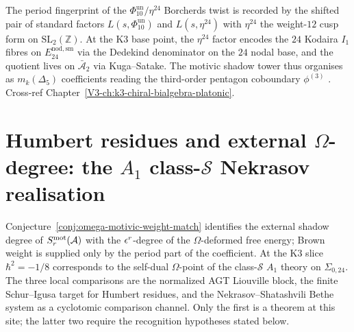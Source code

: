 \begin{remark}
\label{rem:mst-2}
The period fingerprint of the
$\Phi_{10}^{\mathrm{un}}/\eta^{24}$ Borcherds twist is recorded by
the shifted pair of standard factors
$L(s,\Phi_{10}^{\mathrm{un}})$ and $L(s,\eta^{24})$
with $\eta^{24}$ the weight-$12$ cusp form on $\mathrm{SL}_2(\mathbb Z)$.
At the K3 base point, the $\eta^{24}$ factor encodes the $24$ Kodaira
$I_1$ fibres on $E^{\mathrm{nod,sm}}_{24}$ via the Dedekind denominator
on the $24$ nodal base, and the quotient lives on $\bar{\mathcal A}_2$
via Kuga--Satake. The motivic shadow tower thus organises as
$m_k(\Delta_5)$ coefficients reading the third-order pentagon
coboundary $\phi^{(3)}$ \cite{Borcherds1992,KugaSatake1967}. Cross-ref
Chapter~\ref{V3-ch:k3-chiral-bialgebra-platonic}.
\end{remark}

\section{Humbert residues and external $\Omega$-degree: the $A_1$
class-$\mathcal S$ Nekrasov realisation}
\label{sec:mst-nekrasov-A1-sigma-0-24}

Conjecture~\ref{conj:omega-motivic-weight-match} identifies the
external shadow degree of $S_r^{\mathrm{mot}}(\mathcal{A})$ with the $\epsilon^r$-degree of
the $\Omega$-deformed free energy; Brown weight is supplied only by the
period part of the coefficient.
At the K3 slice
$\hbar^2 = -1/8$ corresponds to the self-dual $\Omega$-point of the
class-$\mathcal S$ $A_1$ theory on $\Sigma_{0,24}$. The
three local comparisons are the normalized AGT Liouville block, the
finite Schur--Igusa target for Humbert residues, and the
Nekrasov--Shatashvili Bethe system as a cyclotomic comparison channel.
Only the first is a theorem at this site; the latter two require the
recognition hypotheses stated below.


